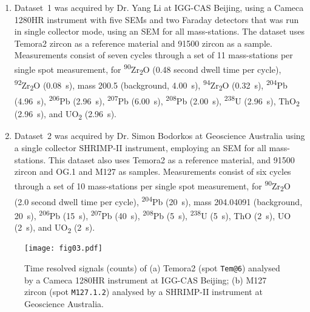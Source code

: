 \documentclass{article}
\begin{document}
\begin{enumerate}
\item Dataset~1 was acquired by Dr. Yang Li at IGG-CAS Beijing, using
  a Cameca 1280HR instrument with five SEMs and two Faraday detectors
  that was run in single collector mode, using an SEM for all
  mass-stations. The dataset uses Temora2 zircon
  \citep[416.8$\pm$1.1~Ma,][]{black2004} as a reference material and
  91500 zircon \citep[1062.4$\pm$0.2~Ma,][]{wiedenbeck1995} as a
  sample. Measurements consist of seven cycles through a set of 11
  mass-stations per single spot measurement, for
  \textsuperscript{90}Zr\textsubscript{2}O (0.48 second dwell time per
  cycle), \textsuperscript{92}Zr\textsubscript{2}O (0.08~s), mass
  200.5 (background, 4.00~s), \textsuperscript{94}Zr\textsubscript{2}O
  (0.32~s), \textsuperscript{204}Pb (4.96~s), \textsuperscript{206}Pb
  (2.96~s), \textsuperscript{207}Pb (6.00~s), \textsuperscript{208}Pb
  (2.00~s), \textsuperscript{238}U (2.96~s), ThO\textsubscript{2}
  (2.96~s), and UO\textsubscript{2} (2.96~s).

\item Dataset~2 was acquired by Dr. Simon Bodorkos at Geoscience
  Australia using a single collector SHRIMP-II instrument, employing
  an SEM for all mass-stations. This dataset also uses Temora2 as a
  reference material, and 91500 zircon and OG.1
  \citep[3440.7$\pm$3.2~Ma,][]{stern2009} and M127
  \citep[524.36$\pm$0.16~Ma,][]{nasdala2016} as samples. Measurements
  consist of six cycles through a set of 10 mass-stations per single
  spot measurement, for \textsuperscript{90}Zr\textsubscript{2}O (2.0
  second dwell time per cycle), \textsuperscript{204}Pb (20~s), mass
  204.04091 (background, 20~s), \textsuperscript{206}Pb (15~s),
  \textsuperscript{207}Pb (40~s), \textsuperscript{208}Pb (5~s),
  \textsuperscript{238}U (5~s), ThO (2~s), UO (2~s), and
  UO\textsubscript{2} (2~s).
\end{enumerate}

\begin{figure}[!ht]
  \texttt{[image: fig03.pdf]}
  \caption{Time resolved signals (counts) of (a) Temora2 (spot
    \texttt{Tem@6}) analysed by a Cameca 1280HR instrument at IGG-CAS
    Beijing; (b) M127 zircon (spot \texttt{M127.1.2}) analysed by a
    SHRIMP-II instrument at Geoscience Australia.}
  \label{fig:timeresolved}
\end{figure}
\end{document}
